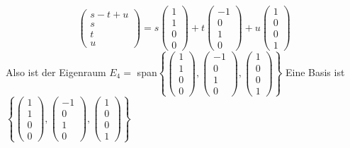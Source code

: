\documentclass{article}
\begin{document}
\[\begin{pmatrix}
    s-t+u \\ s \\ t \\ u
\end{pmatrix} = s\begin{pmatrix}
    1 \\ 1 \\ 0 \\ 0
\end{pmatrix} + t\begin{pmatrix}
    -1 \\ 0 \\ 1 \\ 0
\end{pmatrix} + u\begin{pmatrix}
    1 \\ 0 \\ 0 \\ 1
\end{pmatrix}\]
Also ist der Eigenraum $E_4 =$ span$\left\{ \begin{pmatrix}
    1 \\ 1\\ 0 \\ 0
\end{pmatrix}, \begin{pmatrix}
    -1 \\ 0 \\ 1 \\ 0
\end{pmatrix}, \begin{pmatrix}
    1 \\ 0 \\ 0 \\ 1
\end{pmatrix} \right\}$
Eine Basis ist $\left\{ \begin{pmatrix}
    1 \\ 1\\ 0 \\ 0
\end{pmatrix}, \begin{pmatrix}
    -1 \\ 0 \\ 1 \\ 0
\end{pmatrix}, \begin{pmatrix}
    1 \\ 0 \\ 0 \\ 1
\end{pmatrix} \right\}$
\end{document}
